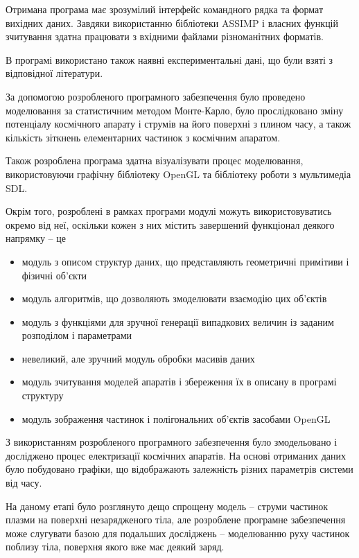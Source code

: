 \documentclass[a4paper,12pt]{article}
\begin{document}
Отримана програма має зрозумілий інтерфейс командного рядка та формат вихідних даних. Завдяки використанню бібліотеки ASSIMP і власних функцій зчитування здатна працювати з вхідними файлами різноманітних форматів.

В програмі використано також наявні експериментальні дані, що були взяті з відповідної літератури.

За допомогою розробленого програмного забезпечення було проведено моделювання за статистичним методом Монте-Карло, було прослідковано зміну потенціалу космічного апарату і струмів на його поверхні з плином часу, а також кількість зіткнень елементарних частинок з космічним апаратом.

Також розроблена програма здатна візуалізувати процес моделювання, використовуючи графічну бібліотеку OpenGL та бібліотеку роботи з мультимедіа SDL.

Окрім того, розроблені в рамках програми модулі можуть використовуватись окремо від неї, оскільки кожен з них містить завершений функціонал деякого напрямку -- це
\begin{itemize}
  \item модуль з описом структур даних, що представляють геометричні примітиви і фізичні об’єкти
  \item модуль алгоритмів, що дозволяють змоделювати взаємодію цих об’єктів
  \item модуль з функціями для зручної генерації випадкових величин із заданим розподілом і параметрами
  \item невеликий, але зручний модуль обробки масивів даних
  \item модуль зчитування моделей апаратів і збереження їх в описану в програмі структуру
  \item модуль зображення частинок і полігональних об’єктів засобами OpenGL
\end{itemize}

З використанням розробленого програмного забезпечення було змодельовано і досліджено процес електризації космічних апаратів. На основі отриманих даних було побудовано графіки, що відображають залежність різних параметрів системи від часу.

На даному етапі було розглянуто дещо спрощену модель -- струми частинок плазми на поверхні незарядженого тіла, але розроблене програмне забезпечення може слугувати базою для подальших досліджень -- моделюванню руху частинок поблизу тіла, поверхня якого вже має деякий заряд.


\newpage
\end{document}
